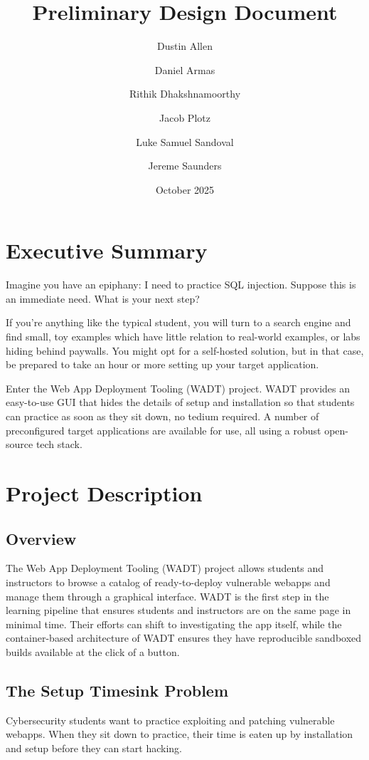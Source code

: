 \documentclass[12pt]{article}
\title{Preliminary Design Document}
\author{
	Dustin Allen
	\and
	Daniel Armas
	\and
	Rithik Dhakshnamoorthy
	\and
	Jacob Plotz
	\and
	Luke Samuel Sandoval
	\and
	Jereme Saunders
}
\date{October 2025}
\begin{document}
\maketitle

\tableofcontents

\section{Executive Summary}
Imagine you have an epiphany: I need to practice SQL injection. Suppose this is an immediate need. What is your next step?

If you're anything like the typical student, you will turn to a search engine and find small, toy examples which have little relation to real-world examples, or labs hiding behind paywalls. You might opt for a self-hosted solution, but in that case, be prepared to take an hour or more setting up your target application.

Enter the Web App Deployment Tooling (WADT) project. WADT provides an easy-to-use GUI that hides the details of setup and installation so that students can practice as soon as they sit down, no tedium required. A number of preconfigured target applications are available for use, all using a robust open-source tech stack.

\section{Project Description}

\subsection {Overview}
The Web App Deployment Tooling (WADT) project allows students and instructors to browse a catalog of ready-to-deploy vulnerable webapps and manage them through a graphical interface. WADT is the first step in the learning pipeline that ensures students and instructors are on the same page in minimal time. Their efforts can shift to investigating the app itself, while the container-based architecture of WADT ensures they have reproducible sandboxed builds available at the click of a button.

\subsection{The Setup Timesink Problem}
Cybersecurity students want to practice exploiting and patching vulnerable webapps. When they sit down to practice, their time is eaten up by installation and setup before they can start hacking.
\end{document}
